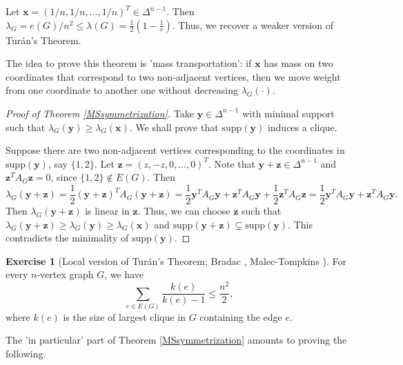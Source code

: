 \documentclass{article}
\theoremstyle{definition}
\newtheorem{exercise}[theorem]{Exercise}
\newcommand{\supp}{\mathrm{supp}}
\def\Turan{Tur\'an}
\begin{document}
Let $\boldsymbol{x} = (1/n, 1/n, ..., 1/n)^T \in \Delta^{n-1}$. Then $\lambda_G = e(G)/n^2 \leq \lambda(G) = \frac{1}{2} (1-\frac{1}{r})$. Thus, we recover a weaker version of \Turan{}'s Theorem.

The idea to prove this theorem is 'mass transportation': if $\boldsymbol{x}$ has mass on two coordinates that correspond to two non-adjacent vertices, then we move weight from one coordinate to another one without decreasing $\lambda_G(\cdot)$.

\begin{proof}[Proof of Theorem \ref{MSsymmetrization}]
    Take $\boldsymbol{y} \in \Delta^{n-1}$ with minimal support such that $\lambda_G(\boldsymbol{y}) \geq \lambda_G(\boldsymbol{x})$. We shall prove that $\supp(\boldsymbol{y})$ induces a clique. 

    Suppose there are two non-adjacent vertices corresponding to the coordinates in $\supp(\boldsymbol{y})$, say $\{1,2\}$. Let $\boldsymbol{z} = (z, -z, 0, ..., 0)^T$. Note that $\boldsymbol{y} + \boldsymbol{z} \in \Delta^{n-1}$ and $\boldsymbol{z}^T A_G \boldsymbol{z} = 0$, since $\{1, 2\} \not\in E(G)$. Then
    \[
    \lambda_G(\boldsymbol{y} + \boldsymbol{z}) = \frac{1}{2}(\boldsymbol{y} + \boldsymbol{z})^T A_G (\boldsymbol{y} + \boldsymbol{z}) 
    = \frac{1}{2} \boldsymbol{y}^T A_G \boldsymbol{y} + \boldsymbol{z}^T A_G \boldsymbol{y} + \frac{1}{2} \boldsymbol{z}^T A_G \boldsymbol{z} = \frac{1}{2} \boldsymbol{y}^T A_G \boldsymbol{y} + \boldsymbol{z}^T A_G \boldsymbol{y}.
    \]
    Then $\lambda_G(\boldsymbol{y} + \boldsymbol{z})$ is linear in $\boldsymbol{z}$. Thus, we can choose $\boldsymbol{z}$ such that $\lambda_G(\boldsymbol{y} + \boldsymbol{z}) \geq \lambda_G(\boldsymbol{y}) \geq \lambda_G(\boldsymbol{x})$ and $\supp(\boldsymbol{y} + \boldsymbol{z}) \subsetneq \supp(\boldsymbol{y})$. This contradicts the minimality of $\supp(\boldsymbol{y})$. 
\end{proof}

\begin{exercise}[Local version of \Turan{}'s Theorem; Bradac \cite{bradavc2022generalization}, Malec-Tompkins \cite{Malec2023local}]
    For every $n$-vertex graph $G$, we have
    \[
    \sum_{e \in E(G)} \frac{k(e)}{k(e)-1} \leq \frac{n^2}{2},
    \]
    where $k(e)$ is the size of largest clique in $G$ containing the edge $e$.
\end{exercise}

The 'in particular' part of Theorem \ref{MSsymmetrization} amounts to proving the following. 
\end{document}
